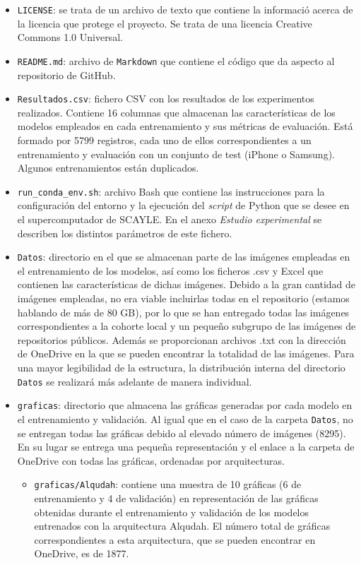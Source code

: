 \begin{itemize}
    \item \texttt{LICENSE}: se trata de un archivo de texto que contiene la informació acerca de la licencia que protege el proyecto. Se trata de una licencia Creative Commons 1.0 Universal.
    \item \texttt{README.md}: archivo de \texttt{Markdown} que contiene el código que da aspecto al repositorio de GitHub. 
    \item \texttt{Resultados.csv}: fichero CSV con los resultados de los experimentos realizados. Contiene 16 columnas que almacenan las características de los modelos empleados en cada entrenamiento y sus métricas de evaluación. Está formado por 5799 registros, cada uno de ellos correspondientes a un entrenamiento y evaluación con un conjunto de test (iPhone o Samsung). Algunos entrenamientos están duplicados.
    \item \texttt{run\_conda\_env.sh}: archivo Bash que contiene las instrucciones para la configuración del entorno y la ejecución del \textit{script} de Python que se desee en el supercomputador de SCAYLE. En el anexo \textit{Estudio experimental} se describen los distintos parámetros de este fichero.
    \item \texttt{Datos}: directorio en el que se almacenan parte de las imágenes empleadas en el entrenamiento de los modelos, así como los ficheros .csv y Excel que contienen las características de dichas imágenes. Debido a la gran cantidad de imágenes empleadas, no era viable incluirlas todas en el repositorio (estamos hablando de más de 80 GB), por lo que se han entregado todas las imágenes correspondientes a la cohorte local y un pequeño subgrupo de las imágenes de repositorios públicos. Además se proporcionan archivos .txt con la dirección de OneDrive en la que se pueden encontrar la totalidad de las imágenes. Para una mayor legibilidad de la estructura, la distribución interna del directorio \texttt{Datos} se realizará más adelante de manera individual.
    \item \texttt{graficas}: directorio que almacena las gráficas generadas por cada modelo en el entrenamiento y validación. Al igual que en el caso de la carpeta \texttt{Datos}, no se entregan todas las gráficas debido al elevado número de imágenes (8295). En su lugar se entrega una pequeña representación y el enlace a la carpeta de OneDrive con todas las gráficas, ordenadas por arquitecturas.
    \begin{itemize}
        \item \texttt{graficas/Alqudah}: contiene una muestra de 10 gráficas (6 de entrenamiento y 4 de validación) en representación de las gráficas obtenidas durante el entrenamiento y validación de los modelos entrenados con la arquitectura Alqudah. El número total de gráficas correspondientes a esta arquitectura, que se pueden encontrar en OneDrive, es de 1877.

\end{itemize}
\end{itemize}
